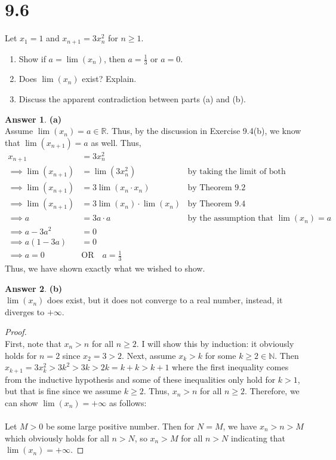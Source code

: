\documentclass[10pt,a4paper]{article}
\theoremstyle{definition}
\newtheorem*{answer*}{Answer}
\begin{document}
\section*{9.6}
Let $x_1 = 1$ and $x_{n+1} = 3x_n^2$ for $n \geq 1$. 
\begin{enumerate}[label = (\alph*)]
\item Show if $a = \lim(x_n)$, then $a = \frac{1}{3}$ or $a = 0$.
\item Does $\lim(x_n)$ exist? Explain.
\item Discuss the apparent contradiction between parts (a) and (b). 
\end{enumerate}

\begin{answer*}{\textbf{(a)}}
\\Assume $\lim(x_n) = a \in \mathbb{R}$. Thus, by the discussion in Exercise 9.4(b), we know that $\lim(x_{n+1}) = a$ as well. Thus, 
\begin{align*}
x_{n + 1} &= 3x_n^2\\
\implies \lim(x_{n+1}) &= \lim(3x_n^2) &\text{by taking the limit of both sides}\\
\implies \lim(x_{n + 1}) &= 3\lim(x_n \cdot x_n) &\text{by Theorem 9.2}\\
\implies \lim(x_{n+1}) &= 3\lim(x_n) \cdot \lim(x_n) &\text{by Theorem 9.4}\\
\implies a &= 3a \cdot a &\text{by the assumption that }\lim(x_n) = a\\
\implies a - 3a^2 &= 0\\
\implies a(1 - 3a) &= 0\\
\implies a = 0 \quad &\text{OR} \quad a = \frac{1}{3}
\end{align*}
Thus, we have shown exactly what we wished to show. 
\end{answer*}

\begin{answer*}{\textbf{(b)}}
\\$\lim(x_n)$ does exist, but it does not converge to a real number, instead, it diverges to $+\infty$.
\begin{proof}{$ $}
\\First, note that $x_n > n$ for all $n \geq 2$. I will show this by induction: it obviously holds for $n = 2$ since $x_2 = 3 > 2$. Next, assume $x_k > k$ for some $k \geq 2 \in \mathbb{N}$. Then $x_{k+1} = 3x_k^2 > 3k^2 > 3k > 2k = k + k > k + 1$ where the first inequality comes from the inductive hypothesis and some of these inequalities only hold for $k > 1$, but that is fine since we assume $k \geq 2$. Thus, $x_n > n$ for all $n \geq 2$. Therefore, we can show $\lim(x_n) = +\infty$ as follows:
\\
\\Let $M > 0$ be some large positive number. Then for $N = M$, we have $x_n > n > M$ which obviously holds for all $n > N$, so $x_n > M$ for all $n > N$ indicating that $\lim(x_n) = +\infty$.
\end{proof}
\end{answer*}
\end{document}
